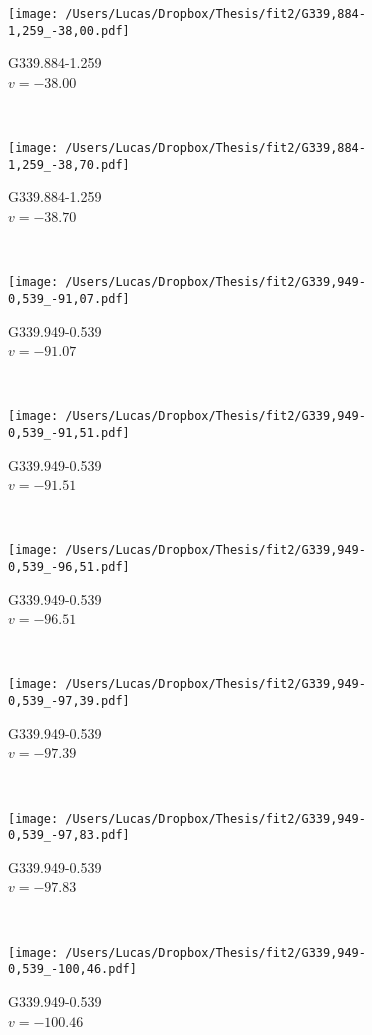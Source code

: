 \begin{figure*}[t]\ContinuedFloat
	\centering
	\begin{subfigure}[t]{0.3\textwidth}
		\texttt{[image: /Users/Lucas/Dropbox/Thesis/fit2/G339,884-1,259\_-38,00.pdf]}
		\caption[]{G339.884-1.259\\$v=-38.00$\,\kms}
	\end{subfigure}
	~
	\begin{subfigure}[t]{0.3\textwidth}
		\texttt{[image: /Users/Lucas/Dropbox/Thesis/fit2/G339,884-1,259\_-38,70.pdf]}
		\caption[]{G339.884-1.259\\$v=-38.70$\,\kms}
	\end{subfigure}
	~
	\begin{subfigure}[t]{0.3\textwidth}
		\texttt{[image: /Users/Lucas/Dropbox/Thesis/fit2/G339,949-0,539\_-91,07.pdf]}
		\caption[]{G339.949-0.539\\$v=-91.07$\,\kms}
	\end{subfigure}
	~
	\begin{subfigure}[t]{0.3\textwidth}
		\texttt{[image: /Users/Lucas/Dropbox/Thesis/fit2/G339,949-0,539\_-91,51.pdf]}
		\caption[]{G339.949-0.539\\$v=-91.51$\,\kms}
	\end{subfigure}
	~
	\begin{subfigure}[t]{0.3\textwidth}
		\texttt{[image: /Users/Lucas/Dropbox/Thesis/fit2/G339,949-0,539\_-96,51.pdf]}
		\caption[]{G339.949-0.539\\$v=-96.51$\,\kms}
	\end{subfigure}
	~
	\begin{subfigure}[t]{0.3\textwidth}
		\texttt{[image: /Users/Lucas/Dropbox/Thesis/fit2/G339,949-0,539\_-97,39.pdf]}
		\caption[]{G339.949-0.539\\$v=-97.39$\,\kms}
	\end{subfigure}
	~
	\begin{subfigure}[t]{0.3\textwidth}
		\texttt{[image: /Users/Lucas/Dropbox/Thesis/fit2/G339,949-0,539\_-97,83.pdf]}
		\caption[]{G339.949-0.539\\$v=-97.83$\,\kms}
	\end{subfigure}
	~
	\begin{subfigure}[t]{0.3\textwidth}
		\texttt{[image: /Users/Lucas/Dropbox/Thesis/fit2/G339,949-0,539\_-100,46.pdf]}
		\caption[]{G339.949-0.539\\$v=-100.46$\,\kms}

\end{subfigure}
\end{figure*}

